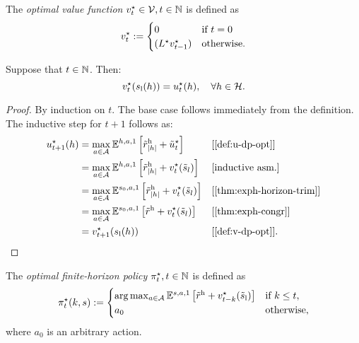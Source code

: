 \begin{definition} \label{def:v-dp-opt}
The \emph{optimal value function} $v^{\star}_t\in \mathcal{V}, t\in \mathbb{N}$ is defined as
\[
v^{\star}_t := 
\begin{cases}
    0 &\text{if } t = 0 \\
    (L^{\star}  v^{\star} _{t-1}) &\text{otherwise}.
\end{cases}
\]
\leanok
\end{definition}

\begin{theorem}
Suppose that $t\in \mathbb{N} $. Then:
\[
v^{\star}_t(s_{\mathrm{l}}(h)) = u^{\star}_t(h), \quad \forall h\in \mathcal{H}.
\]
\end{theorem}
\begin{proof}
By induction on $t$. The base case follows immediately from the definition. The inductive step for $t+1$ follows as:
\begin{align*}
  u\opt_{t+1}(h)
  &= \max_{a\in \mathcal{A}} \E^{h, a, 1} \left[ \rew_{|h|} + \tilde{u}\opt_t  \right]
  && \why{\cref{def:u-dp-opt}} \\
  &= \max_{a\in \mathcal{A}} \E^{h, a, 1} \left[ \rew_{|h|} + v\opt_t(\tilde{s}_l) \right] 
    && \why{inductive asm.}  \\
  &= \max_{a\in \mathcal{A}} \E^{s_0, a, 1} \left[ \rew_{|h|} + v\opt_t(\tilde{s}_l) \right]
    && \why{\cref{thm:exph-horizon-trim}} \\
  &= \max_{a\in \mathcal{A}} \E^{s_0, a, 1} \left[ \rew + v\opt_t(\tilde{s}_l) \right]
  && \why{\cref{thm:exph-congr}} \\
  &= v\opt_{t+1}(s_{\mathrm{l}}(h)) && \why{\cref{def:v-dp-opt}}.
\end{align*}
\end{proof}


\begin{definition} \label{def:pi-opt}
  The \emph{optimal finite-horizon policy} $\pi^{\star}_t, t\in \mathbb{N}$ is defined as
  \[
    \pi^{\star}_t(k,s) :=
    \begin{cases}
      \arg\max_{a\in \mathcal{A}}  \mathbb{E}^{s, a, 1} \left[ \tilde{r}^{\mathrm{h}} + v_{t-k}^{\star} (\tilde{s}_{\mathrm{l}}) \right]
      &\text{if } k \le t, \\
      a_0 &\text{otherwise},
    \end{cases}
  \]
  where $a_0$ is an arbitrary action.
  \leanok
\end{definition}


